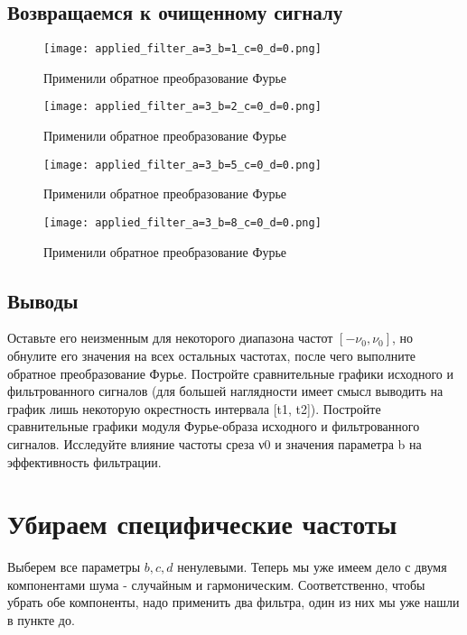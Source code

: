 \newpage
\subsection{Возвращаемся к очищенному сигналу}

\begin{figure}[ht]
    \centering
    \texttt{[image: applied\_filter\_a=3\_b=1\_c=0\_d=0.png]}
    \caption{Применили обратное преобразование Фурье}
\end{figure}

\begin{figure}[ht]
    \centering
    \texttt{[image: applied\_filter\_a=3\_b=2\_c=0\_d=0.png]}
    \caption{Применили обратное преобразование Фурье}
\end{figure}

\begin{figure}[ht]
    \centering
    \texttt{[image: applied\_filter\_a=3\_b=5\_c=0\_d=0.png]}
    \caption{Применили обратное преобразование Фурье}
\end{figure}

\begin{figure}[ht]
    \centering
    \texttt{[image: applied\_filter\_a=3\_b=8\_c=0\_d=0.png]}
    \caption{Применили обратное преобразование Фурье}
\end{figure}

\subsection{Выводы}

Оставьте его неизменным для некоторого диапазона частот $[−\nu_0, \nu_0]$, но обнулите
его значения на всех остальных частотах, после чего выполните обратное преобразование Фурье. Постройте сравнительные графики исходного и фильтрованного
сигналов (для большей наглядности имеет смысл выводить на график лишь некоторую окрестность интервала [t1, t2]). Постройте сравнительные графики модуля
Фурье-образа исходного и фильтрованного сигналов. Исследуйте влияние частоты
среза ν0 и значения параметра b на эффективность фильтрации.


\section{Убираем специфические частоты}

Выберем все параметры $b, c, d$ ненулевыми. Теперь мы уже имеем дело с двумя компонентами шума - случайным и гармоническим. Соответственно, чтобы убрать обе компоненты, надо применить два фильтра, один из них мы уже нашли в пункте до.

